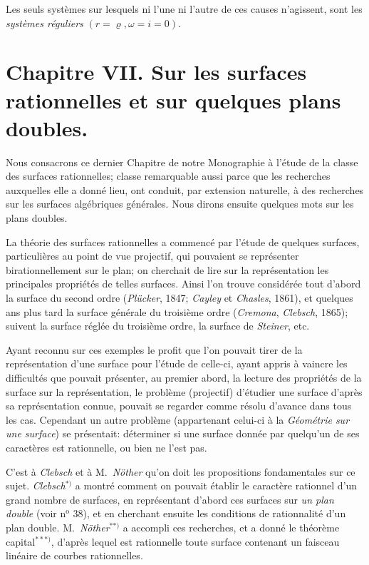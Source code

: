 \documentclass{article}
\begin{document}
Les seuls systèmes sur lesquels ni l'une ni l'autre de ces causes n'agissent, sont les \emph{systèmes réguliers} $(r = \varrho, \omega = i = 0)$.


\section*{Chapitre VII. Sur les surfaces rationnelles et sur quelques plans doubles.}

Nous consacrons ce dernier Chapitre de notre Monographie à l'étude de la classe des surfaces rationnelles; classe remarquable aussi parce que les recherches auxquelles elle a donné lieu, ont conduit, par extension naturelle, à des recherches sur les surfaces algébriques générales. Nous dirons ensuite quelques mots sur les plans doubles.

La théorie des surfaces rationnelles a commencé par l'étude de quelques surfaces, particulières au point de vue projectif, qui pouvaient se représenter birationnellement sur le plan; on cherchait de lire sur la représentation les principales propriétés de telles surfaces. Ainsi l'on trouve considérée tout d'abord la surface du second ordre (\emph{Plücker}, 1847; \emph{Cayley} et \emph{Chasles}, 1861), et quelques ans plus tard la surface générale du troisième ordre (\emph{Cremona}, \emph{Clebsch}, 1865); suivent la surface réglée du troisième ordre, la surface de \emph{Steiner}, etc.

Ayant reconnu sur ces exemples le profit que l'on pouvait tirer de la représentation d'une surface pour l'étude de celle-ci, ayant appris à vaincre les difficultés que pouvait présenter, au premier abord, la lecture des propriétés de la surface sur la représentation, le problème (projectif) d'étudier une surface d'après sa représentation connue, pouvait se regarder comme résolu d'avance dans tous les cas. Cependant un autre problème (appartenant celui-ci à la \emph{Géométrie sur une surface}) se présentait: déterminer si une surface donnée par quelqu'un de ses caractères est rationnelle, ou bien ne l'est pas.

C'est à \emph{Clebsch} et à M.\ \emph{Nöther} qu'on doit les propositions fondamentales sur ce sujet. \emph{Clebsch}${}^{*)}$ a montré comment on pouvait établir le caractère rationnel d'un grand nombre de surfaces, en représentant d'abord ces surfaces sur \emph{un plan double} (voir n${}^{\text{o}}$ 38), et en cherchant ensuite les conditions de rationnalité d'un plan double. M.\ \emph{Nöther}${}^{**)}$ a accompli ces recherches, et a donné le théorème capital${}^{***)}$, d'après lequel est rationnelle toute surface contenant un faisceau linéaire de courbes rationnelles.
\end{document}
